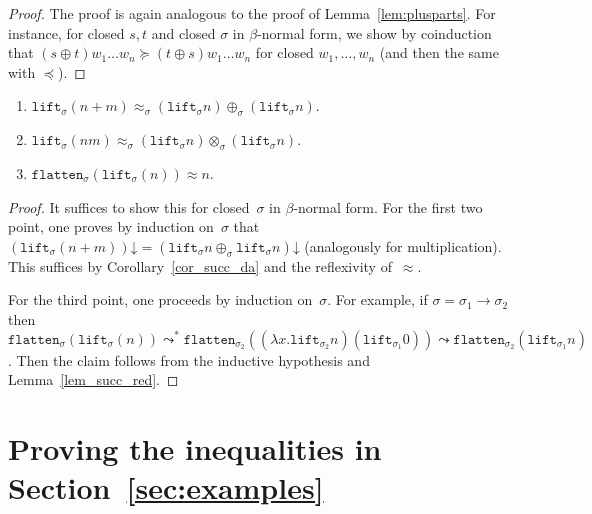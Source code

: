 \documentclass[a4paper,UKenglish,cleveref,autoref,numberwithinsect]{lipics-v2019}
\theoremstyle{definition}
\newcommand{\flatten}{\mathtt{flatten}}
\newcommand{\lift}{\mathtt{lift}}
\newcommand{\refsec}[1]{Section~\ref{sec:#1}}
\newcommand{\da}{\mathord{\downarrow}}
\begin{document}
\begin{proof}
  The proof is again analogous to the proof of
  Lemma~\ref{lem:plusparts}. For instance, for closed $s,t$ and closed
  $\sigma$ in $\beta$-normal form, we show by coinduction that $(s
  \oplus t) w_1 \ldots w_n \succeq (t \oplus s) w_1 \ldots w_n$ for
  closed $w_1,\ldots,w_n$ (and then the same with $\preceq$).
\end{proof}

{ \renewcommand{\thelemma}{\ref{lem_lift_approx}}
\begin{lemma}
  \begin{enumerate}
  \item $\lift_\sigma(n+m) \approx_\sigma (\lift_\sigma n)
    \oplus_\sigma (\lift_\sigma n)$.
  \item $\lift_\sigma(n m) \approx_\sigma (\lift_\sigma n)
    \otimes_\sigma (\lift_\sigma n)$.
  \item $\flatten_\sigma(\lift_\sigma(n)) \approx n$.
  \end{enumerate}
\end{lemma}
\addtocounter{theorem}{-1}}

\begin{proof}
  It suffices to show this for closed~$\sigma$ in $\beta$-normal
  form. For the first two point, one proves by induction on~$\sigma$
  that
  $(\lift_\sigma(n+m))\da = (\lift_\sigma n \oplus_\sigma \lift_\sigma
  n)\da$ (analogously for multiplication). This suffices by
  Corollary~\ref{cor_succ_da} and the reflexivity of~$\approx$.

  For the third point, one proceeds by induction on~$\sigma$. For
  example, if $\sigma = \sigma_1\to\sigma_2$ then
  $\flatten_\sigma(\lift_\sigma(n)) \leadsto^*
  \flatten_{\sigma_2}((\lambda x . \lift_{\sigma_2} n)
  (\lift_{\sigma_1} 0)) \leadsto \flatten_{\sigma_2} (\lift_{\sigma_1}
  n)$. Then the claim follows from the inductive hypothesis and
  Lemma~\ref{lem_succ_red}.
\end{proof}

\section{Proving the inequalities in \refsec{examples}}\label{app_ineqs}
\end{document}
